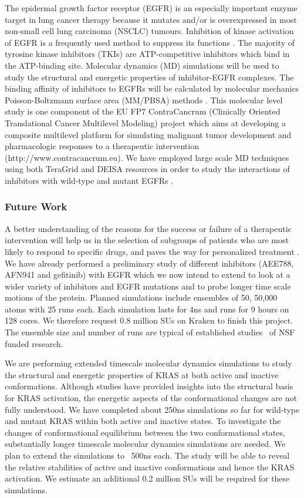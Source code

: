 \documentclass[a4paper,10pt]{article}
\begin{document}
The epidermal growth factor receptor (EGFR) is an especially important enzyme target in lung cancer therapy because it mutates and/or is overexpressed in most non-small cell lung carcinoma (NSCLC) tumours. Inhibition of kinase activation of EGFR is a frequently used method to suppress its functions \cite{bib:nature_tki}. The majority of tyrosine kinase inhibitors (TKIs) are ATP-competitive inhibitors which bind in the ATP-binding site. Molecular dynamics (MD) simulations will be used to study the structural and energetic properties of inhibitor-EGFR complexes. The binding affinity of inhibitors to EGFRs will be calculated by molecular mechanics Poisson-Boltzmann surface area (MM/PBSA) methods \cite{bib:wan_philtrans}. This molecular level study is one component of the EU FP7 ContraCancrum (Clinically Oriented Translational Cancer Multilevel Modeling) project which aims at developing a composite multilevel platform for simulating malignant tumor development and pharmacologic responses to a therapeutic intervention (http://www.contracancrum.eu). We have employed large scale MD techniques using both TeraGrid and DEISA resources in order to study the interactions of inhibitors with wild-type and mutant EGFRs \cite{bib:wc2009}.

\subsubsection{Future Work}
A better understanding of the reasons for the success or failure of a therapeutic intervention will help us in the selection of subgroups of patients who are most likely to respond to specific drugs, and paves the way for personalized treatment \cite{bib:hiv}. We have already performed a preliminary study of different inhibitors (AEE788, AFN941 and gefitinib) with EGFR which we now intend to extend to look at a wider variety of inhibitors and EGFR mutations and to probe longer time scale motions of the protein. Planned simulations include ensembles of 50, 50,000 atoms with 25 runs each. Each simulation lasts for 4ns and runs for 9 hours on 128 cores. We therefore request 0.8 million SUs on Kraken to finish this project. The ensemble size and number of runs are typical of established studies~\cite{bib:wan_philtrans,bib:wc2009} of NSF funded research.

We are performing extended timescale molecular dynamics simulations to study the structural and energetic properties of KRAS at both active and inactive conformations. Although studies have provided insights into the structural basis for KRAS activation, the energetic aspects of the conformational changes are not fully understood. We have completed about 250ns simulations so far for wild-type and mutant KRAS within both active and inactive states. To investigate the changes of conformational equilibrium between the two conformational states, substantially longer timescale molecular dynamics simulations are needed. We plan to extend the simulations to ~500ns each. The study will be able to reveal the relative stabilities of active and inactive conformations and hence the KRAS activation. We estimate an additional 0.2 million SUs will be required for these simulations.
\end{document}
